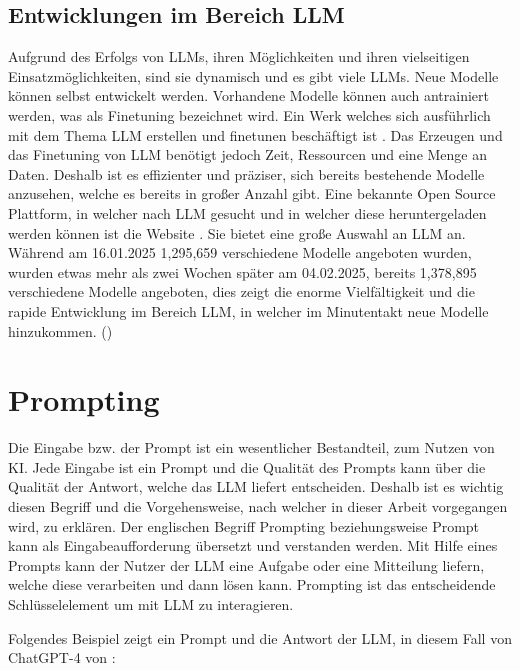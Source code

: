 \documentclass[12pt,toc=bib,toc=listof]{scrreprt}
\begin{document}
\subsection{Entwicklungen im Bereich LLM} %
\label{sec:entwicklungenImBereichLLM}
Aufgrund des Erfolgs von LLMs, ihren Möglichkeiten und ihren vielseitigen Einsatzmöglichkeiten, sind sie dynamisch und es gibt viele LLMs. Neue Modelle können selbst entwickelt werden. Vorhandene Modelle können auch antrainiert werden, was als Finetuning bezeichnet wird. Ein Werk welches sich ausführlich mit dem Thema LLM erstellen und finetunen beschäftigt ist \textcite{Géron2019}. Das Erzeugen und das Finetuning von LLM benötigt jedoch Zeit, Ressourcen und eine Menge an Daten. Deshalb ist es effizienter und präziser, sich bereits bestehende Modelle anzusehen, welche es bereits in großer Anzahl gibt. Eine bekannte Open Source Plattform, in welcher nach LLM gesucht und in welcher diese heruntergeladen werden können ist die Website \textcite{HuggingFace2025}. Sie bietet eine große Auswahl an LLM an. Während am 16.01.2025 1,295,659 verschiedene Modelle angeboten wurden, wurden etwas mehr als zwei Wochen später am 04.02.2025, bereits 1,378,895 verschiedene Modelle angeboten, dies zeigt die enorme Vielfältigkeit und die rapide Entwicklung im Bereich LLM, in welcher im Minutentakt neue Modelle hinzukommen. (\cite{Géron2019})\\

\section{Prompting} %
\label{sec:prompting}
Die Eingabe bzw. der Prompt ist ein wesentlicher Bestandteil, zum Nutzen von KI. Jede Eingabe ist ein Prompt und die Qualität des Prompts kann über die Qualität der Antwort, welche das LLM liefert entscheiden. Deshalb ist es wichtig diesen Begriff und die Vorgehensweise, nach welcher in dieser Arbeit vorgegangen wird, zu erklären. Der englischen Begriff Prompting beziehungsweise Prompt kann als Eingabeaufforderung übersetzt und verstanden werden. Mit Hilfe eines Prompts kann der Nutzer der LLM eine Aufgabe oder eine Mitteilung liefern, welche diese verarbeiten und dann lösen kann. Prompting ist das entscheidende Schlüsselelement um mit LLM zu interagieren.\\
\newpage

\noindent Folgendes Beispiel zeigt ein Prompt und die Antwort der LLM, in diesem Fall von ChatGPT-4 von \textcite{OpenAI2025}:
\end{document}
